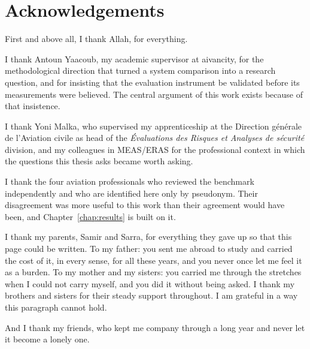\chapter*{Acknowledgements}

First and above all, I thank Allah, for everything.

I thank Antoun Yaacoub, my academic supervisor at aivancity, for the
methodological direction that turned a system comparison into a research
question, and for insisting that the evaluation instrument be validated before
its measurements were believed. The central argument of this work exists because
of that insistence.

I thank Yoni Malka, who supervised my apprenticeship at the Direction
g\'{e}n\'{e}rale de l'Aviation civile as head of the \emph{\'{E}valuations des
Risques et Analyses de s\'{e}curit\'{e}} division, and my colleagues in MEAS/ERAS
for the professional context in which the questions this thesis asks became worth
asking.

I thank the four aviation professionals who reviewed the benchmark independently
and who are identified here only by pseudonym. Their disagreement was more useful
to this work than their agreement would have been, and Chapter~\ref{chap:results}
is built on it.

I thank my parents, Samir and Sarra, for everything they gave up so that this
page could be written. To my father: you sent me abroad to study and carried the
cost of it, in every sense, for all these years, and you never once let me feel
it as a burden. To my mother and my sisters: you carried me through the stretches
when I could not carry myself, and you did it without being asked. I thank my
brothers and sisters for their steady support throughout. I am grateful in a way
this paragraph cannot hold.

And I thank my friends, who kept me company through a long year and never let it
become a lonely one.

